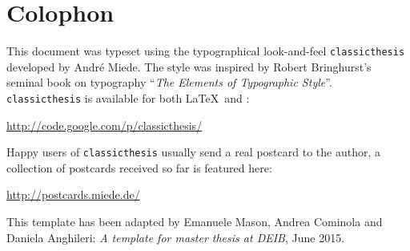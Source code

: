 \thispagestyle{empty}

\hfill

\vfill

\section*{Colophon}
This document was typeset using the typographical look-and-feel \texttt{classicthesis} developed by Andr\'e Miede.
The style was inspired by Robert Bringhurst's seminal book on typography ``\emph{The Elements of Typographic Style}''.
\texttt{classicthesis} is available for both \LaTeX\ and \mLyX: 
\begin{center}
\url{http://code.google.com/p/classicthesis/}
\end{center}
Happy users of \texttt{classicthesis} usually send a real postcard to the author, a collection of postcards received so far is featured here:
\begin{center}
\url{http://postcards.miede.de/}
\end{center}
This template has been adapted by Emanuele Mason, Andrea Cominola and Daniela Anghileri: \textit{A template for master thesis at DEIB}, June 2015.




